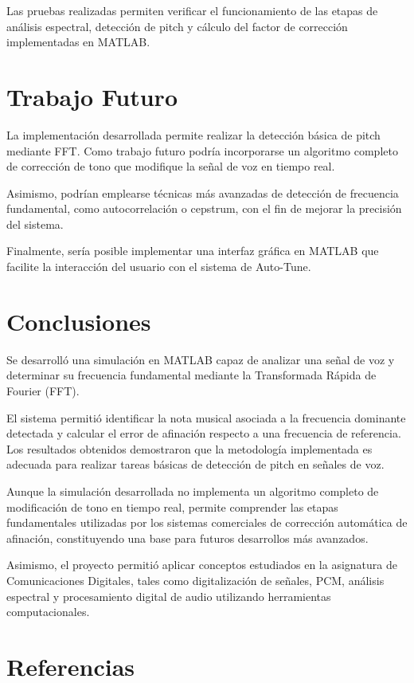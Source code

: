 \documentclass[12pt]{article}
\begin{document}
Las pruebas realizadas permiten verificar el funcionamiento de las etapas de análisis espectral, detección de pitch y cálculo del factor de corrección implementadas en MATLAB.


\section{Trabajo Futuro}

La implementación desarrollada permite realizar la detección básica de pitch mediante FFT. Como trabajo futuro podría incorporarse un algoritmo completo de corrección de tono que modifique la señal de voz en tiempo real.

Asimismo, podrían emplearse técnicas más avanzadas de detección de frecuencia fundamental, como autocorrelación o cepstrum, con el fin de mejorar la precisión del sistema.

Finalmente, sería posible implementar una interfaz gráfica en MATLAB que facilite la interacción del usuario con el sistema de Auto-Tune.


\section{Conclusiones}

Se desarrolló una simulación en MATLAB capaz de analizar una señal de voz y determinar su frecuencia fundamental mediante la Transformada Rápida de Fourier (FFT).

El sistema permitió identificar la nota musical asociada a la frecuencia dominante detectada y calcular el error de afinación respecto a una frecuencia de referencia. Los resultados obtenidos demostraron que la metodología implementada es adecuada para realizar tareas básicas de detección de pitch en señales de voz.

Aunque la simulación desarrollada no implementa un algoritmo completo de modificación de tono en tiempo real, permite comprender las etapas fundamentales utilizadas por los sistemas comerciales de corrección automática de afinación, constituyendo una base para futuros desarrollos más avanzados.

Asimismo, el proyecto permitió aplicar conceptos estudiados en la asignatura de Comunicaciones Digitales, tales como digitalización de señales, PCM, análisis espectral y procesamiento digital de audio utilizando herramientas computacionales.


\section{Referencias}
\end{document}
